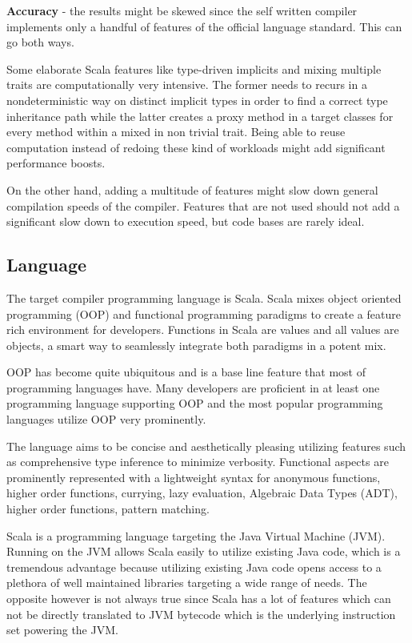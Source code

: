 \documentclass{VUMIFPSbakalaurinis}
\begin{document}
\textbf{Accuracy} - the results might be skewed since the self written compiler implements only a handful of features of the official language standard.
This can go both ways.

Some elaborate Scala features like type-driven implicits and mixing multiple traits are computationally very intensive.
The former needs to recurs in a nondeterministic way on distinct implicit types in order to find a correct type inheritance path while the latter creates a proxy method in a target classes for every method within a mixed in non trivial trait.
Being able to reuse computation instead of redoing these kind of workloads might add significant performance boosts.

On the other hand, adding a multitude of features might slow down general compilation speeds of the compiler.
Features that are not used should not add a significant slow down to execution speed, but code bases are rarely ideal.

\subsection{Language}
The target compiler programming language is Scala.
Scala mixes object oriented programming (OOP)  and functional programming paradigms to create a feature rich environment for developers.
Functions in Scala are values and all values are objects, a smart way to seamlessly integrate both paradigms in a potent mix.

OOP has become quite ubiquitous and is a base line feature that most of programming languages have.
Many developers are proficient in at least one programming language supporting OOP and the most popular programming languages utilize OOP very prominently.

The language aims to be concise and aesthetically pleasing utilizing features such as comprehensive type inference to minimize verbosity.
Functional aspects are prominently represented with a lightweight syntax for anonymous functions, higher order functions, currying, lazy evaluation, Algebraic Data Types (ADT), higher order functions, pattern matching.

Scala is a programming language targeting the Java Virtual Machine (JVM).
Running on the JVM allows Scala easily to utilize existing Java code, which is a tremendous advantage because utilizing existing Java code opens access to a plethora of well maintained libraries targeting a wide range of needs.
The opposite however is not always true since Scala has a lot of features which can not be directly translated to JVM bytecode which is the underlying instruction set powering the JVM.
\end{document}
